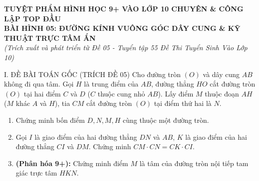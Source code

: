 \documentclass[11pt,a4paper]{article}
\begin{document}
\begin{center}
    {\Large\bfseries\color{blue!80!black} TUYỆT PHẨM HÌNH HỌC 9+ VÀO LỚP 10 CHUYÊN \& CÔNG LẬP TOP ĐẦU}\\[2mm]
    {\large\bfseries BÀI HÌNH 05: ĐƯỜNG KÍNH VUÔNG GÓC DÂY CUNG \& KỸ THUẬT TRỰC TÂM ẨN}\\[1mm]
    \textit{(Trích xuất và phát triển từ Đề 05 - Tuyển tập 55 Đề Thi Tuyển Sinh Vào Lớp 10)}
\end{center}

\vspace{1mm}

\begin{modelbox}{I. ĐỀ BÀI TOÁN GỐC (TRÍCH ĐỀ 05)}
Cho đường tròn $(O)$ và dây cung $AB$ không đi qua tâm. Gọi $H$ là trung điểm của $AB$, đường thẳng $HO$ cắt đường tròn $(O)$ tại hai điểm $C$ và $D$ ($C$ thuộc cung nhỏ $AB$). Lấy điểm $M$ thuộc đoạn $AH$ ($M$ khác $A$ và $H$), tia $CM$ cắt đường tròn $(O)$ tại điểm thứ hai là $N$.
\begin{enumerate}[label=\textbf{\alph*)}]
    \item Chứng minh bốn điểm $D, N, M, H$ cùng thuộc một đường tròn.
    \item Gọi $I$ là giao điểm của hai đường thẳng $DN$ và $AB$, $K$ là giao điểm của hai đường thẳng $CI$ và $DM$. Chứng minh $CM \cdot CN = CK \cdot CI$.
    \item \textbf{(Phân hóa 9+):} Chứng minh điểm $M$ là tâm của đường tròn nội tiếp tam giác trực tâm $HKN$.
\end{enumerate}
\end{modelbox}

\vspace{1mm}
\end{document}
